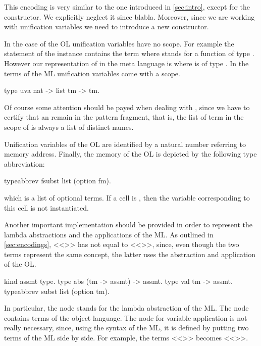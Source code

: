 \documentclass[sigconf,natbib=false]{acmart}
\begin{document}
\noindent
This encoding is very similar to the one introduced in \cref{sec:intro}, except
for the  constructor. We explicitly neglect it since blabla.
Moreover, since we are working with unification variables we need to introduce a
new constructor. 

In the case of the OL unification variables  have no scope.
For example the statement of the instance  contains the
term  where  stands for a function of type
. However our representation of  in the meta
language is  where  is of type .
In the terms of the ML unification variables come with a scope.

\begin{elpicode}
  type uva nat -> list tm -> tm.
\end{elpicode}

\noindent
Of course some attention
should be payed when dealing with , since we have to certify
that an  remain in the pattern fragment, that is, the
list of term in the scope of  is always a list of distinct names.


Unification variables of the OL are identified by a natural number
referring to memory address. 
Finally, the memory of
the OL is depicted by the following type abbreviation:

\begin{elpicode}
  typeabbrev fsubst list (option fm).
\end{elpicode}

\noindent 
which is a list of optional terms. If a cell is , then the variable
corresponding to this cell is not instantiated.

Another important implementation should be provided in order to represent the
lambda abstractions and the applications of the ML. As outlined in
\cref{sec:encodings}, <<>> has not equal to 
<<>>, since, even though the two terms represent the same
concept, the latter uses the abstraction and application of the OL.

\begin{elpicode}
  kind assmt type.
  type abs (tm -> assmt) -> assmt.
  type val tm -> assmt.
  typeabbrev subst list (option tm).
\end{elpicode}

\noindent
In particular, the node  stands for the lambda abstraction of the ML.
The
node  contains terms of the object language. The node for variable
application is not really necessary, since, using the syntax of the ML, it is
defined by putting two terms of the ML side by side. For example, the terms 
<<>> becomes <<>>.
\end{document}
